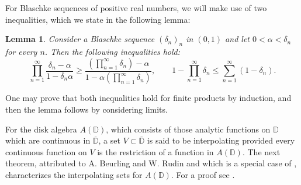 \documentclass[preprint,12pt,number]{elsarticle}
\newtheorem{lemma}[theorem]{Lemma}
\newtheorem{lema}[teo]{Lemma}
\newcommand{\D}{\mathbb{D}}
\begin{document}

For Blaschke sequences of positive real numbers, we will make use of two inequalities, which we state in the following lemma: 

\begin{lemma}\label{lema-blaschke}
    Consider a Blaschke sequence $(\delta_n)_n$ in $(0,1)$ and let $0<\alpha< \delta_n$ for every $n$. Then the following inequalities hold: 
    \[
    \prod_{n=1}^\infty \frac{\delta_n-\alpha}{1-\delta_n\alpha}\geq\frac{\left(\prod_{n=1}^\infty \delta_n\right)-\alpha}{1-\alpha\left(\prod_{n=1}^\infty \delta_n\right)},\quad \quad1-\prod_{n=1}^\infty\delta_n\leq \sum_{n=1}^\infty(1-\delta_n).
    \]
\end{lemma} 

One may prove that both inequalities hold for finite products by induction, and then the lemma follows by considering limits.

For the disk algebra $A(\D)$, which consists of those analytic functions on $\D$ which are continuous in $\overline{\D}$, a set $V\subset \overline{\D}$ is said to be interpolating provided every continuous function on $V$ is the restriction of a function in $A(\D)$. The next theorem, attributed to A. Beurling and W. Rudin and which is a special case of \cite{HeardWells1969}, characterizes the interpolating sets for $A(\D)$. For a proof see \cite{Wojtaszczyk1991}.
\end{document}
